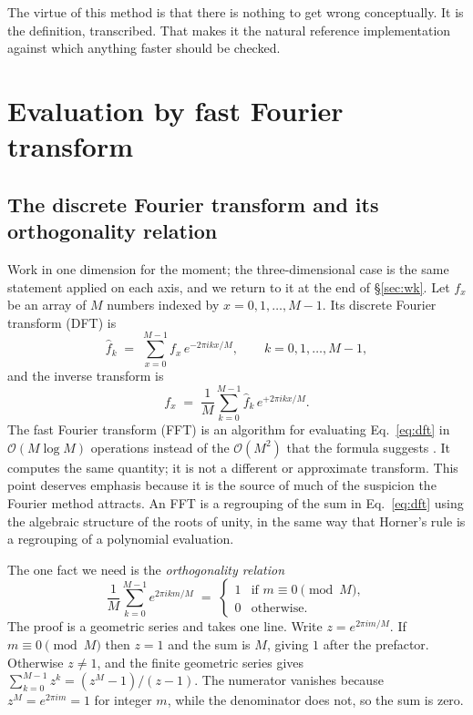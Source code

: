 \documentclass[12pt]{article}
\begin{document}
The virtue of this method is that there is nothing to get wrong
conceptually.  It is the definition, transcribed.  That makes it the natural
reference implementation against which anything faster should be checked.

\section{Evaluation by fast Fourier transform}\label{sec:fft}

\subsection{The discrete Fourier transform and its orthogonality relation}

Work in one dimension for the moment; the three-dimensional case is the same
statement applied on each axis, and we return to it at the end of
\S\ref{sec:wk}.  Let $f_x$ be an array of $M$ numbers indexed by
$x = 0,1,\dots,M-1$.  Its discrete Fourier transform (DFT) is
\begin{equation}\label{eq:dft}
  \hat f_k \;=\; \sum_{x=0}^{M-1} f_x\, e^{-2\pi i k x / M},
  \qquad k = 0,1,\dots,M-1 ,
\end{equation}
and the inverse transform is
\begin{equation}\label{eq:idft}
  f_x \;=\; \frac{1}{M} \sum_{k=0}^{M-1} \hat f_k\, e^{+2\pi i k x / M} .
\end{equation}
The fast Fourier transform (FFT) is an algorithm for evaluating
Eq.~\eqref{eq:dft} in $\mathcal{O}(M\log M)$ operations instead of the
$\mathcal{O}(M^2)$ that the formula suggests \citep{CooleyTukey1965}.  It
computes the same quantity; it is not a different or approximate transform.
This point deserves emphasis because it is the source of much of the
suspicion the Fourier method attracts.  An FFT is a regrouping of the sum in
Eq.~\eqref{eq:dft} using the algebraic structure of the roots of unity, in
the same way that Horner's rule is a regrouping of a polynomial evaluation.

The one fact we need is the \emph{orthogonality relation}
\begin{equation}\label{eq:orthogonality}
  \frac{1}{M}\sum_{k=0}^{M-1} e^{2\pi i k m / M}
  \;=\;
  \begin{cases}
    1 & \text{if } m \equiv 0 \pmod M,\\
    0 & \text{otherwise}.
  \end{cases}
\end{equation}
The proof is a geometric series and takes one line.  Write
$z = e^{2\pi i m / M}$.  If $m \equiv 0 \pmod M$ then $z = 1$ and the sum is
$M$, giving $1$ after the prefactor.  Otherwise $z \neq 1$, and the finite
geometric series gives $\sum_{k=0}^{M-1} z^k = (z^M - 1)/(z - 1)$.  The
numerator vanishes because $z^M = e^{2\pi i m} = 1$ for integer $m$, while
the denominator does not, so the sum is zero.
\end{document}
